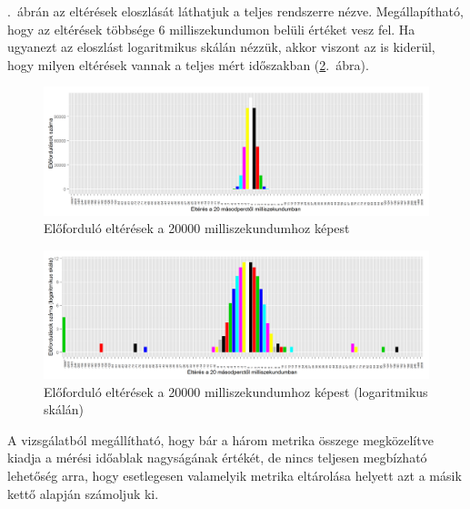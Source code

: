 \documentclass[a4paper,10pt,titlepage]{article}
\begin{document}
.~ábrán az eltérések eloszlását láthatjuk a teljes rendszerre nézve. Megállapítható, hogy az eltérések többsége 6 milliszekundumon belüli értéket vesz fel. Ha ugyanezt az eloszlást logaritmikus skálán nézzük, akkor viszont az is kiderül, hogy milyen eltérések vannak a teljes mért időszakban (\ref{fig:cpu_run_wait_ready-diff-dist-log}.~ábra).

\begin{figure}[h!]
\centering
\includegraphics[width=1.00\textwidth]{figures/cpu_run_wait_ready-diff-dist-20120826230140-20120924083120.png}
\caption{ Előforduló eltérések a 20000 milliszekundumhoz képest \label{fig:cpu_run_wait_ready-diff-dist}}
\end{figure}

\begin{figure}[h!]
\centering
\includegraphics[width=1.00\textwidth]{figures/cpu_run_wait_ready-diff-dist-log-20120826230140-20120924083120.png}
\caption{ Előforduló eltérések a 20000 milliszekundumhoz képest (logaritmikus skálán)\label{fig:cpu_run_wait_ready-diff-dist-log}}
\end{figure}

A vizsgálatból megállítható, hogy bár a három metrika összege megközelítve kiadja a mérési időablak nagyságának értékét, de nincs teljesen megbízható lehetőség arra, hogy esetlegesen valamelyik metrika eltárolása helyett azt a másik kettő alapján számoljuk ki.
\end{document}

